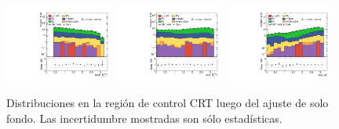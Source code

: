 \begin{figure}[ht!]
\begin{center}
    \includegraphics[width=0.32\textwidth]{images_tmp/results/fr2/can_CRT_dphi_jetmet_afterFit.pdf}
    \includegraphics[width=0.32\textwidth]{images_tmp/results/fr2/can_CRT_dphi_gammet_afterFit.pdf}
    \includegraphics[width=0.32\textwidth]{images_tmp/results/fr2/can_CRT_dphi_gamjet_afterFit.pdf}

    \caption{Distribuciones en la región de control CRT luego del ajuste de solo fondo. Las incertidumbre mostradas son sólo estadísticas.}
    \label{fig:crt_dist}
  \end{center}
\end{figure}

